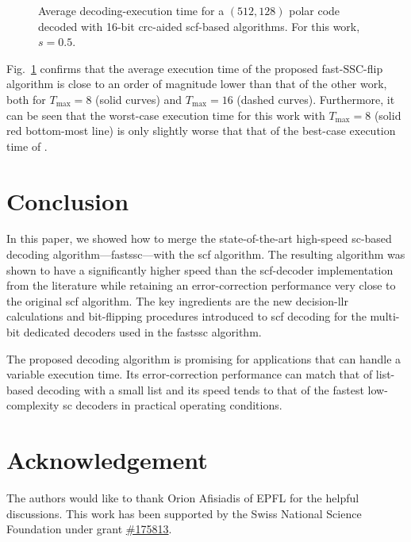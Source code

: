 \documentclass[conference]{IEEEtran}
\begin{document}
\begin{figure}[t]
	\centering
	\vspace{-6pt}
	\caption{Average decoding-execution time for a $(512, 128)$ polar code decoded with 16-bit \gls{crc}-aided \gls{scf}-based algorithms. For this work, $s=0.5$.}
	\label{fig:latency-cmp}\vspace{-10pt}
\end{figure}

Fig.~\ref{fig:latency-cmp} confirms that the average execution time of the proposed fast-SSC-flip algorithm is close to an order of magnitude lower than that of the other work, both for $T_{\max}=8$ (solid curves) and $T_{\max}=16$ (dashed curves). Furthermore, it can be seen that the worst-case execution time for this work with $T_{\max}=8$ (solid red bottom-most line) is only slightly worse that that of the best-case execution time of \cite{Giard_JETCAS_2017}.

\balance

\section{Conclusion}\label{sec:conclusion}
In this paper, we showed how to merge the state-of-the-art high-speed \gls{sc}-based decoding algorithm---\gls{fastssc}---with the \gls{scf} algorithm. The resulting algorithm was shown to have a significantly higher speed than the \gls{scf}-decoder implementation from the literature while retaining an error-correction performance very close to the original \gls{scf} algorithm.
The key ingredients are the new decision-\gls{llr} calculations and bit-flipping procedures introduced to \gls{scf} decoding for the multi-bit dedicated decoders used in the \gls{fastssc} algorithm.

The proposed decoding algorithm is promising for applications that can handle a variable execution time.
Its error-correction performance can match that of list-based decoding with a small list and its speed tends to that of the fastest low-complexity \gls{sc} decoders in practical operating conditions.

\section*{Acknowledgement}
The authors would like to thank Orion Afisiadis of EPFL for the helpful discussions. This work has been supported by the Swiss National Science Foundation under grant \href{http://p3.snf.ch/project-175813}{\#175813}.



\end{document}
